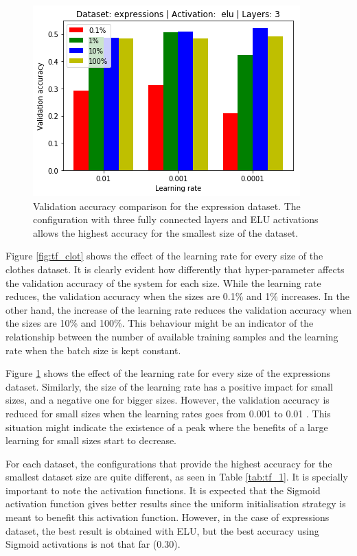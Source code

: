 \documentclass{article}
\begin{document}
\begin{figure}[tb]
    \vskip 5mm
        \begin{center}
            \includegraphics[scale=0.5]{accuracy_reduction_01.png}
            \caption{Validation accuracy comparison for the expression dataset. The configuration with three fully connected layers and ELU activations allows the highest accuracy for the smallest size of the dataset.}
            \label{fig:tf_exp}
        \end{center}
    \vskip -5mm
\end{figure}

Figure \ref{fig:tf_clot} shows the effect of the learning rate for every size of the clothes dataset. It is clearly evident how differently that hyper-parameter affects the validation accuracy of the system for each size. While the learning rate reduces, the validation accuracy when the sizes are 0.1\% and 1\% increases. In the other hand, the increase of the learning rate reduces the validation accuracy when the sizes are 10\% and 100\%. This behaviour might be an indicator of the relationship between the number of available training samples and the learning rate when the batch size is kept constant.

Figure \ref{fig:tf_exp} shows the effect of the learning rate for every size of the expressions dataset. Similarly, the size of the learning rate has a positive impact for small sizes, and a negative one for bigger sizes. However, the validation accuracy is reduced for small sizes when the learning rates goes from 0.001 to 0.01 . This situation might indicate the existence of a peak where the benefits of a large learning for small sizes start to decrease.

For each dataset, the configurations that provide the highest accuracy for the smallest dataset size are quite different, as seen in Table \ref{tab:tf_1}. It is specially important to note the activation functions. It is expected that the Sigmoid activation function gives better results since the uniform initialisation strategy is meant to benefit this activation function. However, in the case of expressions dataset, the best result is obtained with ELU, but the best accuracy using Sigmoid activations is not that far (0.30).
\end{document}
